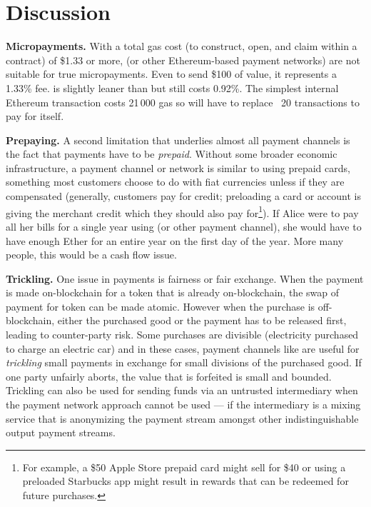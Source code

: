 
\section{Discussion}

\textbf{Micropayments.} With a total gas cost (to construct, open, and claim within a contract) of \$1.33 or more, \ew (or other Ethereum-based payment networks) are not suitable for true micropayments. Even to send \$100 of value, it represents a 1.33\% fee. \eww is slightly leaner than \ew but still costs 0.92\%. The simplest internal Ethereum transaction costs 21\,000 gas so \ew will have to replace ~20 transactions to pay for itself. 

\textbf{Prepaying.} A second limitation that underlies almost all payment channels is the fact that payments have to be \textit{prepaid}. Without some broader economic infrastructure, a payment channel or network is similar to using prepaid cards, something most customers choose to do with fiat currencies unless if they are  compensated (generally, customers pay for credit; preloading a card or account is giving the merchant credit which they should also pay for\footnote{For example, a \$50 Apple Store prepaid card might sell for \$40 or using a preloaded Starbucks app might result in rewards that can be redeemed for future purchases.}). If Alice were to pay all her bills for a single year using \ew (or other payment channel), she would have to have enough Ether for an entire year on the first day of the year. More many people, this would be a cash flow issue. 

\textbf{Trickling.} One issue in payments is fairness or fair exchange. When the payment is made on-blockchain for a token that is already on-blockchain, the swap of payment for token can be made atomic. However when the purchase is off-blockchain, either the purchased good or the payment has to be released first, leading to counter-party risk. Some purchases are divisible (\eg electricity purchased to charge an electric car) and in these cases, payment channels like \ew are useful for \textit{trickling} small payments in exchange for small divisions of the purchased good. If one party unfairly aborts, the value that is forfeited is small and bounded. Trickling can also be used for sending funds via an untrusted intermediary when the payment network approach cannot be used --- \eg if the intermediary is a mixing service that is anonymizing the payment stream amongst other indistinguishable output payment streams.

